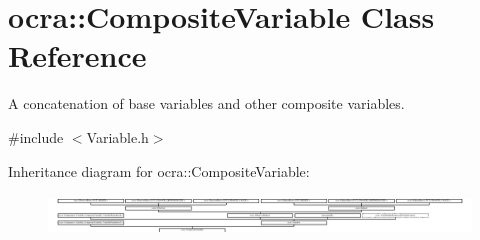 \hypertarget{classocra_1_1CompositeVariable}{}\section{ocra\+:\+:Composite\+Variable Class Reference}
\label{classocra_1_1CompositeVariable}


A concatenation of base variables and other composite variables.  




{\ttfamily \#include $<$Variable.\+h$>$}

Inheritance diagram for ocra\+:\+:Composite\+Variable\+:\begin{figure}[H]
\begin{center}
\leavevmode
\includegraphics[height=1.100629cm]{d2/d7c/classocra_1_1CompositeVariable}
\end{center}
\end{figure}
